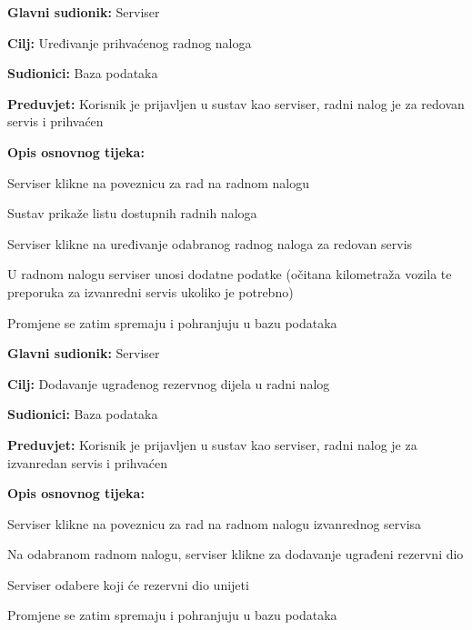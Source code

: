 \noindent {}
\begin{packed_item}
	
	\item \textbf{Glavni sudionik: } Serviser
	\item  \textbf{Cilj:} Uređivanje prihvaćenog radnog naloga
	\item  \textbf{Sudionici:} Baza podataka
	\item  \textbf{Preduvjet:} Korisnik je prijavljen u sustav kao serviser, radni nalog je
	za redovan servis i prihvaćen
	\item  \textbf{Opis osnovnog tijeka:}
	
	\item[] \begin{packed_enum}
		
		\item Serviser klikne na poveznicu za rad na radnom nalogu
		\item Sustav prikaže listu dostupnih radnih naloga
		\item Serviser klikne na uređivanje odabranog radnog naloga za redovan
		servis
		\item U radnom nalogu serviser unosi dodatne podatke (očitana kilometraža
		vozila te preporuka za izvanredni servis ukoliko je potrebno)
		\item Promjene se zatim spremaju i pohranjuju u bazu podataka
		
	\end{packed_enum}
\end{packed_item}

\noindent {}
\begin{packed_item}
	
	\item \textbf{Glavni sudionik: } Serviser
	\item  \textbf{Cilj:} Dodavanje ugrađenog rezervnog dijela u radni nalog
	\item  \textbf{Sudionici:} Baza podataka
	\item  \textbf{Preduvjet:} Korisnik je prijavljen u sustav kao serviser, radni nalog je
	za izvanredan servis i prihvaćen
	\item  \textbf{Opis osnovnog tijeka:}
	
	\item[] \begin{packed_enum}
		
		\item Serviser klikne na poveznicu za rad na radnom nalogu izvanrednog servisa
		\item Na odabranom radnom nalogu, serviser klikne za dodavanje ugrađeni rezervni dio
		\item Serviser odabere koji će rezervni dio unijeti
		\item Promjene se zatim spremaju i pohranjuju u bazu podataka
		
	\end{packed_enum}
\end{packed_item}

